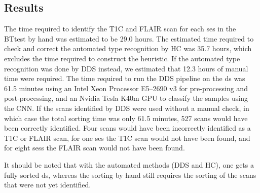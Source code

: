 \begin{subappendices}
\subsection{Results}
The time required to identify the \gls{T1C} and \gls{FLAIR} \gls{scan} for each \gls{ses} in the \gls{BTtest} by hand was estimated to be \num{29.0} hours.
The estimated time required to check and correct the automated \gls{type} recognition by \gls{HC} was \num{35.7} hours, which excludes the time required to construct the heuristic.
If the automated \gls{type} recognition was done by \gls{DDS} instead, we estimated that \num{12.3} hours of manual time were required.
The time required to run the \gls{DDS} pipeline on the \gls{ds} was \num{61.5} minutes using an Intel Xeon Processor E5--2690 v3 for pre-processing and post-processing, and an Nvidia Tesla K40m GPU to classify the \glspl{sample} using the \gls{CNN}.
If the \glspl{scan} identified by \gls{DDS} were used without a manual check, in which case the total sorting time was only \num{61.5} minutes, \num{527} \glspl{scan} would have been correctly identified.
Four \glspl{scan} would have been incorrectly identified as a \gls{T1C} or \gls{FLAIR} \gls{scan}, for one \gls{ses} the \gls{T1C} \gls{scan} would not have been found, and for eight \glspl{ses} the \gls{FLAIR} \gls{scan} would not have been found.

It should be noted that with the automated methods (\gls{DDS} and \gls{HC}), one gets a fully sorted \gls{ds}, whereas the sorting by hand still requires the sorting of the \glspl{scan} that were not yet identified.


\end{subappendices}
